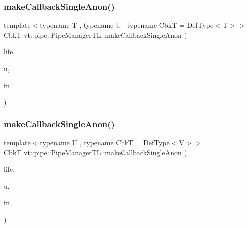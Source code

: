 \mbox{\label{structvt_1_1pipe_1_1_pipe_manager_t_l_a59f0de1aaa6ab7ea6b0eac0667b495f7}} 
\subsubsection{\texorpdfstring{make\+Callback\+Single\+Anon()}{makeCallbackSingleAnon()}\hspace{0.1cm}{\footnotesize\ttfamily [2/6]}}
{\footnotesize\ttfamily template$<$typename T , typename U , typename CbkT  = Def\+Type$<$\+T$>$$>$ \\
CbkT vt\+::pipe\+::\+Pipe\+Manager\+T\+L\+::make\+Callback\+Single\+Anon (\begin{DoxyParamCaption}\item[{\hyperlink{namespacevt_1_1pipe_acb42b284378c0fdac1d7c6335dc26f58}{Lifetime\+Enum}}]{life,  }\item[{U $\ast$}]{u,  }\item[{\hyperlink{structvt_1_1pipe_1_1_pipe_manager_base_a73fdf82ece0411b3dc644c99b763f7a9}{Func\+Msg\+Ctx\+Type}$<$ T, U $>$}]{fn }\end{DoxyParamCaption})}

\mbox{\label{structvt_1_1pipe_1_1_pipe_manager_t_l_a4bdcd4bf9730aa312336568d005e6d01}} 
\subsubsection{\texorpdfstring{make\+Callback\+Single\+Anon()}{makeCallbackSingleAnon()}\hspace{0.1cm}{\footnotesize\ttfamily [3/6]}}
{\footnotesize\ttfamily template$<$typename U , typename CbkT  = Def\+Type$<$\+V$>$$>$ \\
CbkT vt\+::pipe\+::\+Pipe\+Manager\+T\+L\+::make\+Callback\+Single\+Anon (\begin{DoxyParamCaption}\item[{\hyperlink{namespacevt_1_1pipe_acb42b284378c0fdac1d7c6335dc26f58}{Lifetime\+Enum}}]{life,  }\item[{U $\ast$}]{u,  }\item[{\hyperlink{structvt_1_1pipe_1_1_pipe_manager_base_ad8463823b6b4cfdb67c119d6d22e3bac}{Func\+Ctx\+Type}$<$ U $>$}]{fn }\end{DoxyParamCaption})}

